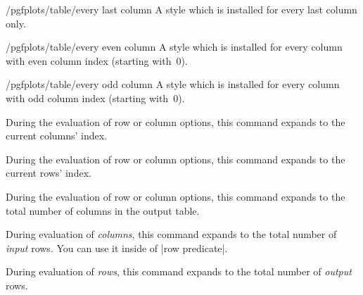 \begin{stylekey}{/pgfplots/table/every last column}
A style which is installed for every last column only.
\end{stylekey}

\begin{stylekey}{/pgfplots/table/every even column}
A style which is installed for every column with even column index (starting with~$0$).
{

\begin{codeexample}
\end{codeexample}

\begin{codeexample}[width=7cm,graphic=white]
\end{codeexample}
}
\end{stylekey}

\begin{stylekey}{/pgfplots/table/every odd column}
A style which is installed for every column with odd column index (starting with~$0$).
\end{stylekey}

\begin{command}{\pgfplotstablecol}
	During the evaluation of row or column options, this command expands to the current columns' index.
\end{command}
\label{pgfplotstable:page:tablerow}
\begin{command}{\pgfplotstablerow}
	During the evaluation of row or column options, this command expands to the current rows' index.
\end{command}
\begin{command}{\pgfplotstablecols}
	During the evaluation of row or column options, this command expands to the total number of columns in the output table.
\end{command}
\begin{command}{\pgfplotstablerows}
	During evaluation of \emph{columns}, this command expands to the total number of \emph{input} rows. You can use it inside of |row predicate|.

	During evaluation of \emph{rows}, this command expands to the total number of \emph{output} rows.
\end{command}


